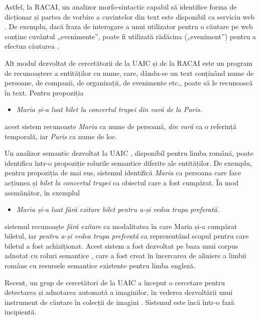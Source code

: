 \begin{multicols}{2}
Astfel, la RACAI, un analizor morfo-sintactic capabil să identifice forma de dicționar și partea de vorbire a cuvintelor din text este disponibil ca serviciu web \cite{webservicesUrl}. De exemplu, dacă fraza de interogare a unui utilizator pentru o căutare pe web conține cuvântul „evenimente”, poate fi utilizată rădăcina („eveniment”) pentru a efectua căutarea \cite{webservicesArt}.

Alt modul dezvoltat de cercetătorii de la UAIC și de la RACAI este un program de recunoaștere a entităților cu nume, care, dându-se un text conținând nume de persoane, de companii, de organizații, de evenimente etc., poate să le recunoască în text. Pentru propoziția 

\begin{itemize}
\item\textit{Maria și-a luat bilet la concertul trupei din vară de la Paris.}
\end{itemize}

\noindent acest sistem recunoaște \textit{Maria} ca nume de persoană, \textit{din vară} ca o referință temporală, iar \textit{Paris} ca nume de loc.

Un analizor semantic dezvoltat la UAIC \cite{isda}, disponibil pentru limba română, poate identifica într-o propoziție rolurile semantice diferite ale entităților. De exemplu, pentru propoziția de mai sus, sistemul identifică \textit{Maria} ca persoana care face acțiunea și \textit{bilet la concertul trupei} ca obiectul care a fost cumpărat. În mod asemănător, în exemplul

\begin{itemize}
\item\textit{Maria și-a luat fără ezitare bilet pentru a-și vedea trupa preferată.}
\end{itemize}

\noindent
sistemul recunoaște \textit{fără ezitare} ca modalitatea în care Maria și-a cumpărat biletul, iar \textit{pentru a-și vedea trupa preferată} ca reprezentând scopul pentru care biletul a fost achiziționat. Acest sistem a fost dezvoltat pe baza unui corpus adnotat cu roluri semantice \cite{trandabat}, care a fost creat în încercarea de aliniere a limbii române cu resursele semantice existente pentru limba engleză.

Recent, un grup de cercetători de la UAIC a început o cercetare pentru detectarea și adnotarea automată a imaginilor, în vederea dezvoltării unui instrument de căutare în colecții de imagini \cite{iftene}. Sistemul este încă într-o fază incipientă.


\end{multicols}
